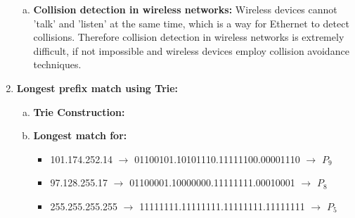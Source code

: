 \documentclass[11pt]{article}
\begin{document}
\begin{enumerate}[1.]
\begin{enumerate}[(a)]
  \item \textbf { Collision detection in wireless networks: }
  Wireless devices cannot 'talk' and 'listen' at the same time, which is a way for Ethernet to detect collisions. Therefore collision detection in wireless networks is extremely difficult, if not impossible and wireless devices employ collision avoidance techniques.
  \end{enumerate}

\newpage
 \item %
 \textbf { Longest prefix match using Trie: }
 	\begin{enumerate}[(a)]
 	\item \textbf { Trie Construction: }


 	\item \textbf {Longest match for:}
 		\begin{itemize}
 		\item 101.174.252.14
    $\to$ 01100101.10101110.11111100.00001110 $\to$ $P_9$

 		\item 97.128.255.17
    $\to$ 01100001.10000000.11111111.00010001 $\to$ $P_8$

 		\item 255.255.255.255
    $\to$ 11111111.11111111.11111111.11111111 $\to$ $P_5$
 		\end{itemize}
 	\end{enumerate}


\end{enumerate}
\end{document}

